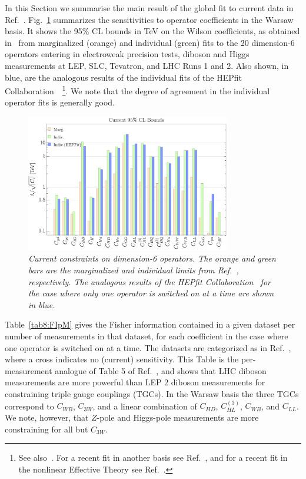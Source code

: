 \documentclass[../report.tex]{subfiles}
\begin{document}
In this Section we summarise the main result of the global fit to current data in Ref.~\cite{Ellis:2018gqa}. Fig.~\ref{fig8:HEPfitvsEMSY} summarizes the sensitivities to operator coefficients in the Warsaw basis.
It shows the 95\% CL bounds in TeV on the Wilson coefficients, as obtained in~\cite{Ellis:2018gqa} from marginalized (orange) and individual (green) fits to the 20 dimension-6 operators 
entering in electroweak precision tests, diboson and Higgs measurements at LEP, SLC, Tevatron, and LHC Runs 1 and 2.
Also shown, in blue, are the analogous results of the individual fits of the HEPfit Collaboration~\cite{Ciuchini:2013pca, deBlas:2016ojx}~\footnote{See 
also~\cite{luca:talk, otto:talk}. For a recent fit in another basis see Ref.~\cite{Alves:2018nof}, and
for a recent fit in the nonlinear Effective Theory see Ref.~\cite{deBlas:2018tjm}.}. 
We note that the degree of agreement in the individual operator fits is generally good. 


\begin{figure}
  \centering
\includegraphics[width=0.8\textwidth]{section8/plots/barcompcnorm.pdf}
 \caption{\it Current constraints on dimension-6 operators. The orange and green bars are the marginalized and individual limits from Ref.~\cite{Ellis:2018gqa}, respectively. 
 The analogous results of the HEPfit Collaboration~\cite{Ciuchini:2013pca, deBlas:2016ojx} for the case where only one operator is switched on at a time are shown in blue.}
   \label{fig8:HEPfitvsEMSY}
\end{figure} 

Table~\ref{tab8:FIpM} gives the Fisher information contained in a given dataset per number of measurements in that dataset,
for each coefficient in the case where one operator is switched on at a time.
The datasets are categorized as in Ref.~\cite{Ellis:2018gqa}, where a
cross indicates no (current) sensitivity.
This Table is the per-measurement analogue of Table 5 of Ref.~\cite{Ellis:2018gqa}, and
shows that LHC diboson measurements are more powerful than LEP 2 diboson measurements for constraining triple gauge couplings (TGCs).
In the Warsaw basis the three TGCs correspond to $C_{WB}$, $C_{3W}$, and a linear combination of $C_{HD}$, $C_{HL}^{(3)}$, $C_{WB}$, and $C_{LL}$.
We note, however, that $Z$-pole and Higgs-pole measurements are more constraining for all but $C_{3W}$. 
\end{document}
